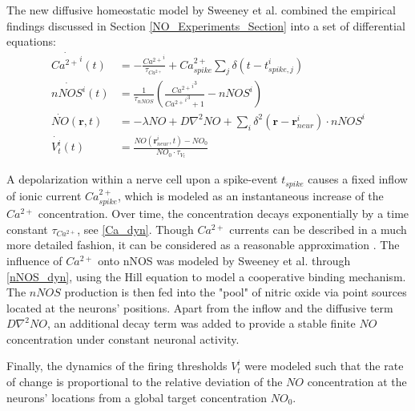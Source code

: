 \documentclass[10pt,a4paper]{article}
\begin{document}
The new diffusive homeostatic model by Sweeney et al. combined the empirical findings discussed in Section \ref{NO_Experiments_Section} into a set of differential equations:   
\begin{align}
\dot{{Ca^{2+}}^i}(t) &= -\frac{{Ca^{2+}}^i}{\tau_{Ca^{2+}}} + Ca^{2+}_{spike} \sum_{j} \delta(t-t^i_{spike,j}) \label{Ca_dyn}\\
\dot{nNOS^i}(t) &= \frac{1}{\tau_{nNOS}} \left(  \frac{{{Ca^{2+}}^i}^3}{{{Ca^{2+}}^i}^3+1} - nNOS^i \right) \label{nNOS_dyn}\\
\dot{NO}(\mathbf{r},t)&=-\lambda NO + D \nabla^2 NO + \sum_{i} \delta^2(\mathbf{r}-\mathbf{r}_{neur}^i)\cdot nNOS^i \label{NO_dyn}\\
\dot{V_t^i}(t) &= \frac{NO(\mathbf{r}_{neur}^i,t)-NO_0}{NO_0\cdot\tau_{V_t}} \label{Theta_dyn}
\end{align}

A depolarization within a nerve cell upon a spike-event $t_{spike}$ causes a fixed inflow of ionic current $Ca^{2+}_{spike}$, which is modeled as an instantaneous increase of the $Ca^{2+}$ concentration. Over time, the concentration decays exponentially by a time constant $\tau_{Ca^{2+}}$, see \eqref{Ca_dyn}. Though $Ca^{2+}$ currents can be described in a much more detailed fashion, it can be considered as a reasonable approximation \cite[p.~198-203]{Theor_Neur_Dayan}. The influence of $Ca^{2+}$ onto nNOS was modeled by Sweeney et al. through \eqref{nNOS_dyn}, using the Hill equation \cite{Hill_Equ} to model a cooperative binding mechanism. The $nNOS$ production is then fed into the "pool" of nitric oxide via point sources located at the neurons' positions. Apart from the inflow and the diffusive term $D \nabla^2 NO$, an additional decay term was added to provide a stable finite $NO$ concentration under constant neuronal activity.

Finally, the dynamics of the firing thresholds $V_t^i$ were modeled such that the rate of change is proportional to the relative deviation of the $NO$ concentration at the neurons' locations from a global target concentration $NO_0$. 
\end{document}
